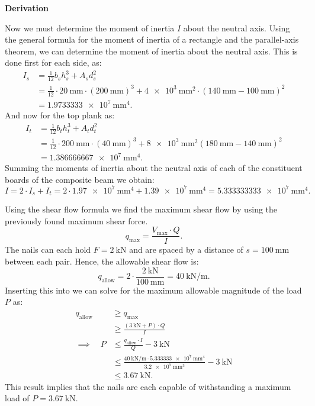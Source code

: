 \documentclass[a4paper]{article}
\numberwithin{equation}{problem}
\newcommand{\AUheading}[1]{%
  \par\vspace{.4\baselineskip}%
  {\sffamily\bfseries\color{AUblueDark}#1\par}%
  \nobreak%
}
\newenvironment{derivation}[1][Derivation]{%
  \AUheading{#1}
  \begingroup\allowdisplaybreaks
  \setlength{\abovedisplayskip}{6pt}%
  \setlength{\belowdisplayskip}{6pt}%
  \setlength{\abovedisplayshortskip}{4pt}%
  \setlength{\belowdisplayshortskip}{4pt}%
}{\par\endgroup\medskip}
\begin{document}
\begin{derivation}
  Now we must determine the moment of inertia $I$ about the neutral axis.
  Using the general formula for the moment of inertia of a rectangle and the parallel-axis theorem, we can determine the moment of inertia about the neutral axis.
  This is done first for each side, as:
  \begin{align*}
    I_s &= \frac{1}{12} b_s h_s^3 + A_s d_s^2\\
    &= \frac{1}{12} \cdot  \qty{20}{\mm} \cdot \left( \qty{200}{\mm}  \right)^3 + \qty{4e3}{\mm^2} \cdot \left( \qty{140}{\mm} - \qty{100}{\mm}   \right)^2 \\
    &= \qty{1,9733333e7}{\mm^{4}} 
  .\end{align*}
  And now for the top plank as:
  \begin{align*}
    I_t &= \frac{1}{12} b_t h_t^3 + A_t d_t^2 \\
    &= \frac{1}{12} \cdot \qty{200}{\mm} \cdot \left( \qty{40}{\mm}  \right)^3 + \qty{8e3}{\mm^2} \left( \qty{180}{\mm} - \qty{140}{\mm} \right)^2 \\
    &= \qty{1,386666667e7}{\mm^{4}} 
  .\end{align*}
  Summing the moments of inertia about the neutral axis of each of the constituent boards of the composite beam we obtain:
  \begin{equation*}
    I = 2 \cdot I_s + I_t = 2 \cdot \qty{1,97e7}{\mm^{4}} + \qty{1,39e7}{\mm^{4}} = \qty{5,333333333e7}{\mm^{4}}  
  .\end{equation*}
  
  Using the shear flow formula we find the maximum shear flow by using the previously found maximum shear force.
  \begin{equation} \label{eq:shearforce}
    q_{\mathrm{max}} = \frac{V_{\mathrm{max}} \cdot Q}{I}
  .\end{equation}
  The nails can each hold $F = \qty{2}{\kN}$ and are spaced by a distance of $s = \qty{100}{\mm}$ between each pair.
  Hence, the allowable shear flow is:
  \begin{equation*}
    q_{\text{allow}} = 2 \cdot \frac{\qty{2}{\kN} }{\qty{100}{\mm}} = \qty{40}{\kN\per\m} 
  .\end{equation*}
  Inserting this into  we can solve for the maximum allowable magnitude of the load $P$ as:
  \begin{align*}
    q_{\text{allow}} &\geq q_{\mathrm{max}} \\
    &\geq \frac{\left( \qty{3}{\kN} + P \right)\cdot  Q}{I} \\
    \implies \quad P &\leq \frac{q_{\text{allow}} \cdot I}{Q} - \qty{3}{\kN} \\
                     &\leq \frac{\qty{40}{\kN\per\m} \cdot \qty{5,333333e7}{\mm^{4}} }{\qty{3,2e5}{\mm^3}} - \qty{3}{\kN} \\
                     &\leq \qty{3,67}{\kN} 
  .\end{align*}
  This result implies that the nails are each capable of withstanding a maximum load of $P = \qty{3,67}{\kN}$.


\end{derivation}
\end{document}
